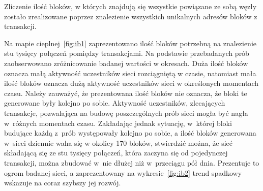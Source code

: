 \documentclass[12pt, twoside, final, openany]{mgr}
\begin{document}
\indent Zliczenie ilość bloków, w których znajdują się wszystkie powiązane ze sobą węzły zostało zrealizowane poprzez znalezienie wszystkich unikalnych adresów bloków z transakcji.

\indent Na mapie cieplnej~\ref{fig:ib1} zaprezentowano ilość bloków potrzebną na znalezienie stu tysięcy połączeń pomiędzy transakcjami. Na podstawie przebadanych prób zaobserwowano zróżnicowanie badanej wartości w okresach. Duża ilość bloków oznacza małą aktywność uczestników sieci rozciągniętą w czasie, natomiast mała ilość bloków oznacza dużą aktywność uczestników sieci w określonych momentach czasu. Należy zauważyć, że prezentowana ilość bloków nie oznacza, że bloki te generowane były kolejno po sobie. Aktywność uczestników, zlecających transakcje, pozwalająca na budowę poszczególnych prób sieci mogła być nagła w~różnych momentach czasu. Zakładając jednak sytuację, w~której bloki budujące każdą z~prób występowały kolejno po sobie, a ilość bloków generowana w~sieci dziennie waha się w okolicy 170 bloków, stwierdzić można, że sieć składającą się ze stu tysięcy połączeń, która zaczyna się od pojedynczej transakcji, można zbudować w~nie dłużej niż w~przeciągu pół dnia. Prezentuje to ogrom badanej sieci, a zaprezentowany na wykresie~\ref{fig:ib2} trend spadkowy wskazuje na coraz szybszy jej rozwój. 
\end{document}
